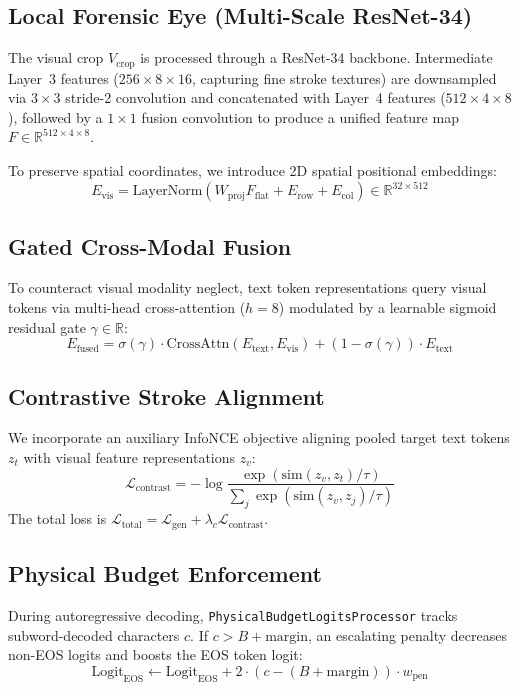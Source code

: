 \documentclass[10pt,twocolumn]{article}
\begin{document}
\subsection{Local Forensic Eye (Multi-Scale ResNet-34)}
The visual crop $V_{\text{crop}}$ is processed through a ResNet-34 backbone. Intermediate Layer~3 features ($256 \times 8 \times 16$, capturing fine stroke textures) are downsampled via $3\times 3$ stride-2 convolution and concatenated with Layer~4 features ($512 \times 4 \times 8$), followed by a $1\times 1$ fusion convolution to produce a unified feature map $F \in \mathbb{R}^{512 \times 4 \times 8}$.

To preserve spatial coordinates, we introduce 2D spatial positional embeddings:
\begin{equation}
E_{\text{vis}} = \text{LayerNorm}\left(W_{\text{proj}} F_{\text{flat}} + E_{\text{row}} + E_{\text{col}}\right) \in \mathbb{R}^{32 \times 512}
\end{equation}

\subsection{Gated Cross-Modal Fusion}
To counteract visual modality neglect, text token representations query visual tokens via multi-head cross-attention ($h = 8$) modulated by a learnable sigmoid residual gate $\gamma \in \mathbb{R}$:
\begin{equation}
E_{\text{fused}} = \sigma(\gamma) \cdot \text{CrossAttn}(E_{\text{text}}, E_{\text{vis}}) + (1 - \sigma(\gamma)) \cdot E_{\text{text}}
\end{equation}

\subsection{Contrastive Stroke Alignment}
We incorporate an auxiliary InfoNCE objective aligning pooled target text tokens $z_t$ with visual feature representations $z_v$:
\begin{equation}
\mathcal{L}_{\text{contrast}} = -\log \frac{\exp(\text{sim}(z_v, z_t) / \tau)}{\sum_{j} \exp(\text{sim}(z_v, z_j) / \tau)}
\end{equation}
The total loss is $\mathcal{L}_{\text{total}} = \mathcal{L}_{\text{gen}} + \lambda_c \mathcal{L}_{\text{contrast}}$.

\subsection{Physical Budget Enforcement}
During autoregressive decoding, \texttt{PhysicalBudgetLogitsProcessor} tracks subword-decoded characters $c$. If $c > B + \text{margin}$, an escalating penalty decreases non-EOS logits and boosts the EOS token logit:
\begin{equation}
\text{Logit}_{\text{EOS}} \leftarrow \text{Logit}_{\text{EOS}} + 2 \cdot (c - (B + \text{margin})) \cdot w_{\text{pen}}
\end{equation}
\end{document}
